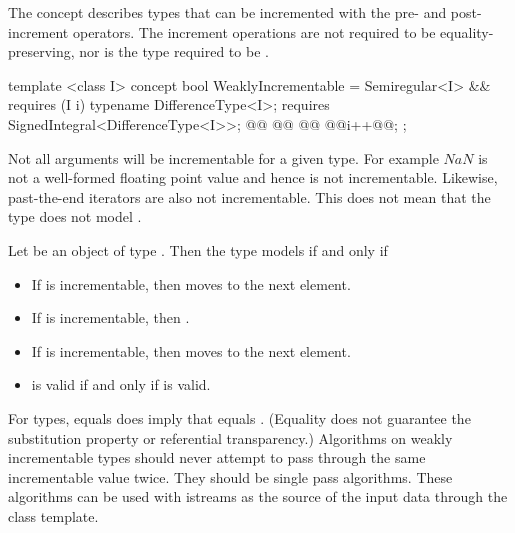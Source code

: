 \begin{addedblock}
The  concept describes types that can be incremented with the pre-
and post-increment operators. The increment operations are not required to be equality-preserving,
nor is the type required to be .

%
\begin{codeblock}
  template <class I>
  concept bool WeaklyIncrementable =
    Semiregular<I> &&
    requires (I i) {
      typename DifferenceType<I>;
      requires SignedIntegral<DifferenceType<I>>;
      @@
      @@
      @@
      @\oldtxt{\{ }@i++@\oldtxt{ \}}@;
    };
\end{codeblock}

\pnum
Not all arguments will be incrementable for a given type. For example $NaN$ is not a well-formed
floating point value and hence is not incrementable. Likewise, past-the-end iterators are also not
incrementable. This does not mean that the type does not model .

\pnum
Let  be an object of type .
Then the type  models  if and only if

\begin{itemize}
\item If  is incrementable, then  moves  to the next element.
\item If  is incrementable, then .
\item If  is incrementable, then  moves  to the next element.
\item {} is valid if and only if  is valid.
\end{itemize}



\pnum
\enternote For  types,  equals  does imply that 
equals . (Equality does not guarantee the substitution property or referential
transparency.) Algorithms on weakly incrementable types should never attempt to pass
through the same incrementable value twice. They should be single pass algorithms. These algorithms
can be used with istreams as the source of the input data through the  class
template.\exitnote


\end{addedblock}
